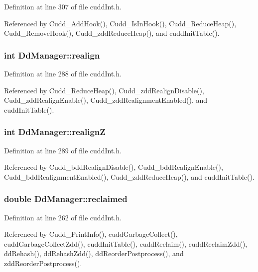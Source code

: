 Definition at line 307 of file cudd\-Int.h.

Referenced by Cudd\_\-Add\-Hook(), Cudd\_\-Is\-In\-Hook(), Cudd\_\-Reduce\-Heap(), Cudd\_\-Remove\-Hook(), Cudd\_\-zdd\-Reduce\-Heap(), and cudd\-Init\-Table().
\subsubsection{\setlength{\rightskip}{0pt plus 5cm}int \bf{Dd\-Manager::realign}}\label{structDdManager_b50e58f446cce13dd36cf63230e2d836}




Definition at line 288 of file cudd\-Int.h.

Referenced by Cudd\_\-Reduce\-Heap(), Cudd\_\-zdd\-Realign\-Disable(), Cudd\_\-zdd\-Realign\-Enable(), Cudd\_\-zdd\-Realignment\-Enabled(), and cudd\-Init\-Table().
\subsubsection{\setlength{\rightskip}{0pt plus 5cm}int \bf{Dd\-Manager::realign\-Z}}\label{structDdManager_eb6927b50fc978391e3eda5161df8c5c}




Definition at line 289 of file cudd\-Int.h.

Referenced by Cudd\_\-bdd\-Realign\-Disable(), Cudd\_\-bdd\-Realign\-Enable(), Cudd\_\-bdd\-Realignment\-Enabled(), Cudd\_\-zdd\-Reduce\-Heap(), and cudd\-Init\-Table().
\subsubsection{\setlength{\rightskip}{0pt plus 5cm}double \bf{Dd\-Manager::reclaimed}}\label{structDdManager_4ab47b179b205207c8e738f4b6ed1ebd}




Definition at line 262 of file cudd\-Int.h.

Referenced by Cudd\_\-Print\-Info(), cudd\-Garbage\-Collect(), cudd\-Garbage\-Collect\-Zdd(), cudd\-Init\-Table(), cudd\-Reclaim(), cudd\-Reclaim\-Zdd(), dd\-Rehash(), dd\-Rehash\-Zdd(), dd\-Reorder\-Postprocess(), and zdd\-Reorder\-Postprocess().
